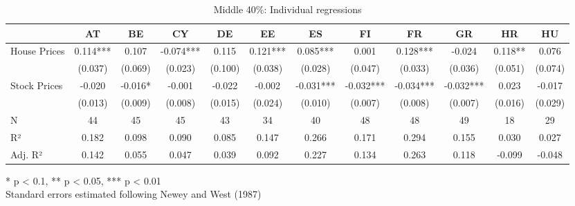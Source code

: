 \begin{table}[h]
\caption{Middle 40\%: Individual regressions} 
\fontsize{7.5pt}{9.0pt}\selectfont
\begin{tabular*}{\linewidth}{@{\extracolsep{\fill}}lccccccccccc}
\toprule
  & AT & BE & CY & DE & EE & ES & FI & FR & GR & HR & HU \\ 
\midrule\addlinespace[2.5pt]
House Prices & 0.114*** & 0.107 & -0.074*** & 0.115 & 0.121*** & 0.085*** & 0.001 & 0.128*** & -0.024 & 0.118** & 0.076 \\ 
 & (0.037) & (0.069) & (0.023) & (0.100) & (0.038) & (0.028) & (0.047) & (0.033) & (0.036) & (0.051) & (0.074) \\ 
Stock Prices & -0.020 & -0.016* & -0.001 & -0.022 & -0.002 & -0.031*** & -0.032*** & -0.034*** & -0.032*** & 0.023 & -0.017 \\ 
{} & {(0.013)} & {(0.009)} & {(0.008)} & {(0.015)} & {(0.024)} & {(0.010)} & {(0.007)} & {(0.008)} & {(0.007)} & {(0.016)} & {(0.029)} \\ 
N & 44 & 45 & 45 & 43 & 34 & 40 & 48 & 48 & 49 & 18 & 29 \\ 
R² & 0.182 & 0.098 & 0.090 & 0.085 & 0.147 & 0.266 & 0.171 & 0.294 & 0.155 & 0.030 & 0.027 \\ 
Adj. R² & 0.142 & 0.055 & 0.047 & 0.039 & 0.092 & 0.227 & 0.134 & 0.263 & 0.118 & -0.099 & -0.048 \\ 
\bottomrule
\end{tabular*}
\begin{minipage}{\linewidth}
* p < 0.1, ** p < 0.05, *** p < 0.01\\
Standard errors estimated following Newey and West (1987)\\
\end{minipage}
\end{table}

